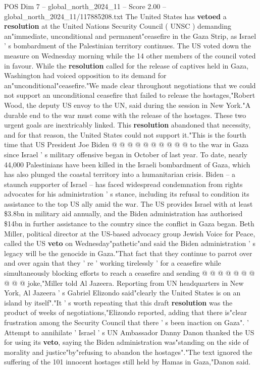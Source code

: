 \begin{textsample}{POS Dim 7 – global\_north\_2024\_11 – Score 2.00 – global\_north\_2024\_11/117885208.txt}  \label{ex:f7_pos_198}
The United States has \textbf{vetoed} a \textbf{resolution} at the United Nations Security Council ( UNSC ) demanding an"immediate, unconditional and permanent"ceasefire in the Gaza Strip, as Israel ' s bombardment of the Palestinian territory continues.
The US voted down the measure on Wednesday morning while the 14 other members of the council voted in favour.
While the \textbf{resolution} called for the release of captives held in Gaza, Washington had voiced opposition to its demand for an"unconditional"ceasefire."We made clear throughout negotiations that we could not support an unconditional ceasefire that failed to release the hostages,"Robert Wood, the deputy US envoy to the UN, said during the session in New York."A durable end to the war must come with the release of the hostages.
These two urgent goals are inextricably linked.
This \textbf{resolution} abandoned that necessity, and for that reason, the United States could not support it."This is the fourth time that US President Joe Biden @ @ @ @ @ @ @ @ @ @ to the war in Gaza since Israel ' s military offensive began in October of last year.
To date, nearly 44,000 Palestinians have been killed in the Israeli bombardment of Gaza, which has also plunged the coastal territory into a humanitarian crisis.
Biden -- a staunch supporter of Israel -- has faced widespread condemnation from rights advocates for his administration ' s stance, including its refusal to condition its assistance to the top US ally amid the war.
The US provides Israel with at least \$3.8bn in military aid annually, and the Biden administration has authorised \$14bn in further assistance to the country since the conflict in Gaza began.
Beth Miller, political director at the US-based advocacy group Jewish Voice for Peace, called the US \textbf{veto} on Wednesday"pathetic"and said the Biden administration ' s legacy will be the genocide in Gaza."That fact that they continue to parrot over and over again that they ' re ' working tirelessly ' for a ceasefire while simultaneously blocking efforts to reach a ceasefire and sending @ @ @ @ @ @ @ @ @ @ joke,"Miller told Al Jazeera.
Reporting from UN headquarters in New York, Al Jazeera ' s Gabriel Elizondo said"clearly the United States is on an island by itself"."It ' s worth repeating that this draft \textbf{resolution} was the product of weeks of negotiations,"Elizondo reported, adding that there is"clear frustration among the Security Council that there ' s been inaction on Gaza". ' Attempt to annihilate ' Israel ' s UN Ambassador Danny Danon thanked the US for using its \textbf{veto}, saying the Biden administration was"standing on the side of morality and justice"by"refusing to abandon the hostages"."The text ignored the suffering of the 101 innocent hostages still held by Hamas in Gaza,"Danon said.

\end{textsample}
